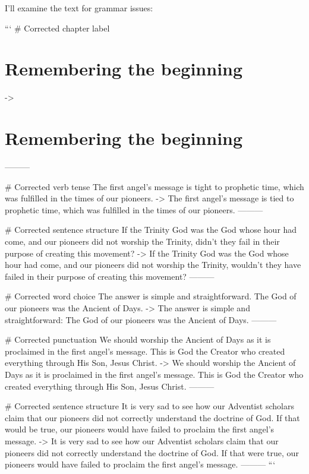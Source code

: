 I'll examine the text for grammar issues:

```
# Corrected chapter label
\chapter{Remembering the beginning} \label{chap:remembering-the-beginning}
->
\chapter{Remembering the beginning} \label{chap:remembering-the-beginning}
---------

# Corrected verb tense
The first angel's message is tight to prophetic time, which was fulfilled in the times of our pioneers.
->
The first angel's message is tied to prophetic time, which was fulfilled in the times of our pioneers.
---------

# Corrected sentence structure
If the Trinity God was the God whose hour had come, and our pioneers did not worship the Trinity, didn't they fail in their purpose of creating this movement?
->
If the Trinity God was the God whose hour had come, and our pioneers did not worship the Trinity, wouldn't they have failed in their purpose of creating this movement?
---------

# Corrected word choice
The answer is simple and straightforward. The God of our pioneers was the Ancient of Days.
->
The answer is simple and straightforward: The God of our pioneers was the Ancient of Days.
---------

# Corrected punctuation
We should worship the Ancient of Days as it is proclaimed in the first angel's message. This is God the Creator who created everything through His Son, Jesus Christ.
->
We should worship the Ancient of Days as it is proclaimed in the first angel's message. This is God the Creator who created everything through His Son, Jesus Christ.
---------

# Corrected sentence structure
It is very sad to see how our Adventist scholars claim that our pioneers did not correctly understand the doctrine of God. If that would be true, our pioneers would have failed to proclaim the first angel's message.
->
It is very sad to see how our Adventist scholars claim that our pioneers did not correctly understand the doctrine of God. If that were true, our pioneers would have failed to proclaim the first angel's message.
---------
```